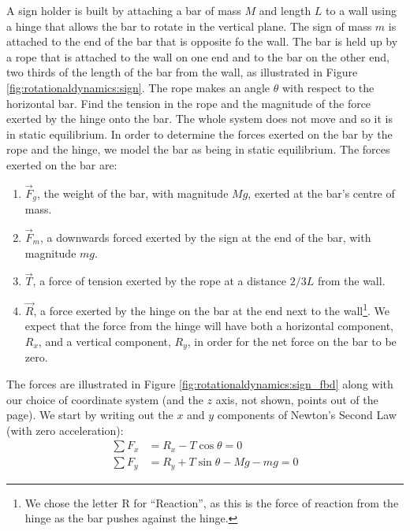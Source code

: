 \begin{example}{ A sign holder is built by attaching a bar of mass $M$ and length $L$ to a wall using a hinge that allows the bar to rotate in the vertical plane. The sign of mass $m$ is attached to the end of the  bar that is opposite fo the wall. The bar is held up by a rope that is attached to the wall on one end and to the bar on the other end, two thirds of the length of the bar from the wall, as illustrated in Figure \ref{fig:rotationaldynamics:sign}. The rope makes an angle $\theta$ with respect to the horizontal bar. Find the tension in the rope and the magnitude of the force exerted by the hinge onto the bar.}
The whole system does not move and so it is in static equilibrium. In order to determine the forces exerted on the bar by the rope and the hinge, we model the bar as being in static equilibrium. The forces exerted on the bar are:
\begin{enumerate}
\item $\vec F_g$, the weight of the bar, with magnitude $Mg$, exerted at the bar's centre of mass.
\item $\vec F_m$, a downwards forced exerted by the sign at the end of the bar, with magnitude $mg$.
\item $\vec T$, a force of tension exerted by the rope at a distance $2/3 L$ from the wall.
\item $\vec R$, a force exerted by the hinge on the bar at the end next to the wall\footnote{We chose the letter R for ``Reaction'', as this is the force of reaction from the hinge as the bar pushes against the hinge.}. We expect that the force from the hinge will have both a horizontal component, $R_x$, and a vertical component, $R_y$, in order for the net force on the bar to be zero.
\end{enumerate}
The forces are illustrated in Figure \ref{fig:rotationaldynamics:sign_fbd} along with our choice of coordinate system (and the $z$ axis, not shown, points out of the page).
We start by writing out the $x$ and $y$ components of Newton's Second Law (with zero acceleration):
\begin{align*}
\sum F_x &= R_x - T\cos\theta =0\\
\sum F_y &= R_y + T\sin\theta - Mg - mg=0

\end{align*}
\end{example}
